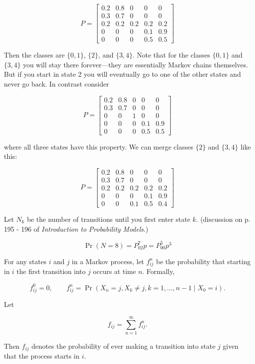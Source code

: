 \begin{example}

\[
P = \begin{bmatrix}
0.2 & 0.8 & 0 & 0 & 0 \\
0.3 & 0.7 & 0 & 0 & 0\\
0.2 & 0.2 & 0.2 & 0.2 & 0.2 \\
0 & 0 & 0& 0.1 & 0.9 \\
0 & 0 & 0& 0.5 & 0.5 
\end{bmatrix}
\]

Then the classes are \(\{0, 1\}\), \(\{2\}\), and \(\{3, 4\}\). Note that for the classes \(\{0, 1\}\) and  \(\{3, 4\}\) you will stay there forever---they are essentially Markov chains themselves. But if you start in state 2 you will eventually go to one of the other states and never go back. In contrast consider

\[
P = \begin{bmatrix}
0.2 & 0.8 & 0 & 0 & 0 \\
0.3 & 0.7 & 0 & 0 & 0\\
0 & 0 & 1 & 0 & 0 \\
0 & 0 & 0& 0.1 & 0.9 \\
0 & 0 & 0& 0.5 & 0.5 
\end{bmatrix}
\]

where all three states have this property. We can merge classes \(\{2\}\) and \(\{3, 4\}\) like this:

\[
P = \begin{bmatrix}
0.2 & 0.8 & 0 & 0 & 0 \\
0.3 & 0.7 & 0 & 0 & 0\\
0.2 & 0.2 & 0.2 & 0.2 & 0.2 \\
0 & 0 & 0& 0.1 & 0.9 \\
0 & 0 & 0.1& 0.5 & 0.4 
\end{bmatrix}
\]

\end{example}

Let \(N_k\) be the number of transitions until you first enter state \(k\). (discussion on p. 195 - 196 of \textit{Introduction to Probability Models}.)

\begin{example}

\[
\Pr(N=8) = P_{02}^7 p = P_{00}^5 p^3
\]

\end{example}

\begin{definition} For any states \(i\) and \(j\) in a Markov process, let \(f_{ij}^n\) be the probability that starting in \(i\) the first transition into \(j\) occurs at time \(n\). Formally,

\[
f_{ij}^0 = 0, \qquad f_{ij}^n = \Pr(X_n = j, X_k \neq j, k = 1, \ldots, n-1 \mid X_0 = i).
\]

Let 

\[
f_{ij} = \sum_{n=1}^\infty f_{ij}^n.
\]

Then \(f_{ij}\) denotes the probability of ever making a transition into state \(j\) given that the process starts in \(i\).

\end{definition}

